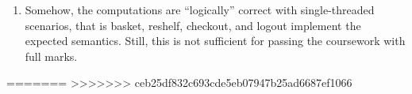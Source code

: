 \documentclass{article}
\begin{document}
\begin{itemize}
\begin{enumerate}
		\item Somehow, the computations are ``logically'' correct with single-threaded scenarios, that is \textsf{basket}, \textsf{reshelf}, \textsf{checkout}, and \textsf{logout} implement the expected semantics. Still, this is not sufficient for passing the coursework with full marks. 
		\end{enumerate}
=======
%
>>>>>>> ceb25df832c693cde5eb07947b25ad6687ef1066
	\end{itemize}
	
\end{document}
